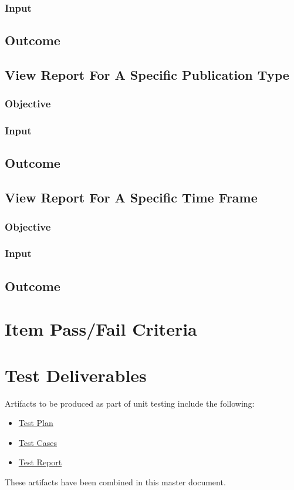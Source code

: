 \subsubsection{Input}
\subsection{Outcome}

\subsection{View Report For A Specific Publication Type}
\subsubsection{Objective}
\subsubsection{Input}
\subsection{Outcome}

\subsection{View Report For A Specific Time Frame}
\subsubsection{Objective}
\subsubsection{Input}
\subsection{Outcome}

\section{Item Pass/Fail Criteria}
\label{sec:passFileCrit}

\section{Test Deliverables}
\label{sec:testDeliverables}
Artifacts to be produced as part of unit testing include the following:
\begin{itemize}
	\item \hyperlink{labelp}{Test Plan}
	\item \hyperlink{label}{Test Cases}
	\item \hyperlink{labelr}{Test Report}
\end{itemize}
These artifacts have been combined in this master document.

